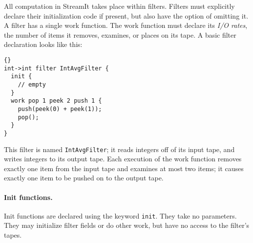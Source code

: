 \documentclass[11pt]{article}
\newcommand{\old}{\marginpar{\footnotesize \textbf{~~--~Old~--}}}
\begin{document}
All computation in StreamIt takes place within filters.  Filters must
explicitly declare their initialization code if present, but also have
the option of omitting it.  A filter has a single {\old} work function.
The work
function must declare its \emph{I/O rates}, the number of items 
it removes, examines, or places on its tape.  A basic filter
declaration looks like this:

\begin{lstlisting}{}
int->int filter IntAvgFilter {
  init {
    // empty
  }
  work pop 1 peek 2 push 1 {
    push(peek(0) + peek(1));
    pop();
  }
}
\end{lstlisting}

This filter is named \lstinline|IntAvgFilter|; it reads integers off of its
input tape, and writes integers to its output tape.  Each execution of
the work function removes exactly one item from the input tape and
examines at most two items; it causes exactly one item to be pushed on
to the output tape.




\paragraph{Init functions.}  Init functions are declared using the
keyword \lstinline|init|.  They take no parameters.  They may initialize
filter fields or do other work, but have no access to the filter's
tapes.
\end{document}
